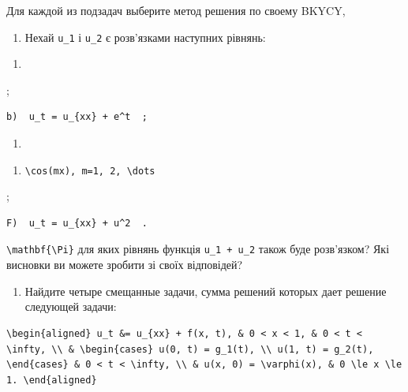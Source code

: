 \documentclass[
  ukrainian,
]{article}
\providecommand{\tightlist}{%
  \setlength{\itemsep}{0pt}\setlength{\parskip}{0pt}}
\begin{document}
Для каждой из подзадач выберите метод решения по своему BKYCY,

\begin{enumerate}
\def\labelenumi{\arabic{enumi}.}
\setcounter{enumi}{2}
\tightlist
\item
  Нехай \texttt{u\_1} і \texttt{u\_2} є розв'язками наступних рівнянь:
\end{enumerate}

\begin{enumerate}
\def\labelenumi{\alph{enumi})}
\tightlist
\item
\end{enumerate}

;

\begin{verbatim}
b)  u_t = u_{xx} + e^t  ;
\end{verbatim}

\begin{enumerate}
\def\labelenumi{\Alph{enumi})}
\setcounter{enumi}{1}
\tightlist
\item
\end{enumerate}

\begin{enumerate}
\def\labelenumi{\arabic{enumi}.}
\setcounter{enumi}{4}
\tightlist
\item
  \texttt{\textbackslash{}cos(mx),\ m=1,\ 2,\ \textbackslash{}dots}
\end{enumerate}

;

\begin{verbatim}
F)  u_t = u_{xx} + u^2  .
\end{verbatim}

\texttt{\textbackslash{}mathbf\{\textbackslash{}Pi\}} для яких рівнянь
функція \texttt{u\_1\ +\ u\_2} також буде розв'язком? Які висновки ви
можете зробити зі своїх відповідей?

\begin{enumerate}
\def\labelenumi{\arabic{enumi}.}
\setcounter{enumi}{3}
\tightlist
\item
  Найдите четыре смещанные задачи, сумма решений которых дает решение
  следующей задачи:
\end{enumerate}

\begin{verbatim}
\begin{aligned} u_t &= u_{xx} + f(x, t), & 0 < x < 1, & 0 < t < \infty, \\ & \begin{cases} u(0, t) = g_1(t), \\ u(1, t) = g_2(t), \end{cases} & 0 < t < \infty, \\ & u(x, 0) = \varphi(x), & 0 \le x \le 1. \end{aligned}
\end{verbatim}
\end{document}
